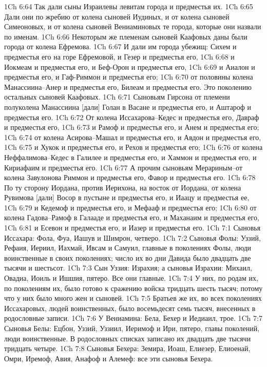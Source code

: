 1Ch 6:64  Так дали сыны Израилевы левитам города и предместья их.
1Ch 6:65  Дали они по жребию от колена сыновей Иудиных, и от колена сыновей Симеоновых, и от колена сыновей Вениаминовых те города, которые они назвали по именам.
1Ch 6:66  Некоторым же племенам сыновей Каафовых даны были города от колена Ефремова.
1Ch 6:67  И дали им города убежищ: Сихем и предместья его на горе Ефремовой, и Гезер и предместья его,
1Ch 6:68  и Иокмеам и предместья его, и Беф-Орон и предместья его,
1Ch 6:69  и Аиалон и предместья его, и Гаф-Риммон и предместья его;
1Ch 6:70  от половины колена Манассиина--Анер и предместья его, Билеам и предместья его. Это поколению остальных сыновей Каафовых.
1Ch 6:71  Сыновьям Гирсона от племени полуколена Манассиина [дали] Голан в Васане и предместья его, и Аштароф и предместья его.
1Ch 6:72  От колена Иссахарова--Кедес и предместья его, Давраф и предместья его,
1Ch 6:73  и Рамоф и предместья его, и Анем и предместья его;
1Ch 6:74  от колена Асирова--Машал и предместья его, и Авдон и предместья его,
1Ch 6:75  и Хукок и предместья его, и Рехов и предместья его;
1Ch 6:76  от колена Неффалимова--Кедес в Галилее и предместья его, и Хаммон и предместья его, и Кириафаим и предместья его.
1Ch 6:77  А прочим сыновьям Мерариным--от колена Завулонова Риммон и предместья его, Фавор и предместья его.
1Ch 6:78  По ту сторону Иордана, против Иерихона, на восток от Иордана, от колена Рувимова [дали] Восор в пустыне и предместья его, и Иаацу и предместья ее,
1Ch 6:79  и Кедемоф и предместья его, и Мефааф и предместья его;
1Ch 6:80  от колена Гадова--Рамоф в Галааде и предместья его, и Маханаим и предместья его,
1Ch 6:81  и Есевон и предместья его, и Иазер и предместья его.
1Ch 7:1  Сыновья Иссахара: Фола, Фуа, Иашув и Шимрон, четверо.
1Ch 7:2  Сыновья Фолы: Уззий, Рефаия, Иериил, Иахмай, Ивсам и Самуил, главные в поколениях Фолы, люди воинственные в своих поколениях; число их во дни Давида было двадцать две тысячи и шестьсот.
1Ch 7:3  Сын Уззия: Израхия; а сыновья Израхии: Михаил, Овадиа, Иоиль и Ишшия, пятеро. Все они главные.
1Ch 7:4  У них, по родам их, по поколениям их, было готово к сражению войска тридцать шесть тысяч; потому что у них было много жен и сыновей.
1Ch 7:5  Братьев же их, во всех поколениях Иссахаровых, людей воинственных, было восемьдесят семь тысяч, внесенных в родословные записи.
1Ch 7:6  У Вениамина: Бела, Бехер и Иедиаил, трое.
1Ch 7:7  Сыновья Белы: Ецбон, Уззий, Уззиил, Иеримоф и Ири, пятеро, главы поколений, люди воинственные. В родословных списках записано их двадцать две тысячи тридцать четыре.
1Ch 7:8  Сыновья Бехера: Земира, Иоаш, Елиезер, Елиоенай, Омри, Иремоф, Авия, Анафоф и Алемеф: все эти сыновья Бехера.
